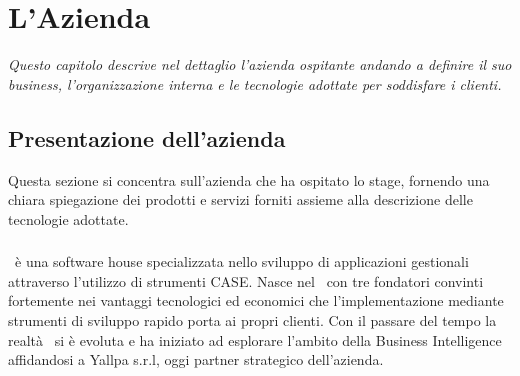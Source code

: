 

\chapter{L'Azienda}
\label{cap1:L'Azienda}






\textit{Questo capitolo descrive nel dettaglio l'azienda ospitante andando a definire il suo business, l’organizzazione interna e le tecnologie adottate per soddisfare i clienti.}

\section{Presentazione dell'azienda}
\label{cap1:Presentazione dell'azienda}
Questa sezione si concentra sull'azienda che ha ospitato lo stage, fornendo una chiara spiegazione dei prodotti e servizi forniti assieme alla descrizione delle tecnologie adottate.

\subsection{\azienda}
\label{cap1:Tepui}
\azienda\ è una software house specializzata nello sviluppo di applicazioni gestionali attraverso l'utilizzo di strumenti CASE. 
Nasce nel \todo\ con  tre fondatori convinti fortemente nei vantaggi tecnologici ed economici che l'implementazione mediante strumenti di sviluppo rapido porta ai propri clienti. Con il passare del tempo la realtà \azienda\ si è evoluta e ha iniziato ad esplorare l'ambito della Business Intelligence  affidandosi a Yallpa s.r.l, oggi partner strategico dell'azienda. 


